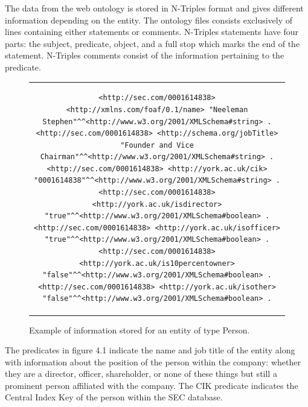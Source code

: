 \documentclass{UoYCSproject}
\begin{document}
The data from the web ontology is stored in N-Triples format and gives different information depending on the entity. The ontology files consists exclusively of lines containing either statements or comments. N-Triples statements have four parts: the subject, predicate, object, and a full stop which marks the end of the statement. N-Triples comments consist of the information pertaining to the predicate.\newpage

\begin{figure}[t]
\begin{center}
\begin{tabular}{c}
\begin{lstlisting}[breaklines, basicstyle=\small, columns=fullflexible]
<http://sec.com/0001614838> <http://xmlns.com/foaf/0.1/name> "Neeleman Stephen"^^<http://www.w3.org/2001/XMLSchema#string> .
<http://sec.com/0001614838> <http://schema.org/jobTitle> "Founder and Vice Chairman"^^<http://www.w3.org/2001/XMLSchema#string> .
<http://sec.com/0001614838> <http://york.ac.uk/cik> "0001614838"^^<http://www.w3.org/2001/XMLSchema#string> .
<http://sec.com/0001614838> <http://york.ac.uk/isdirector> "true"^^<http://www.w3.org/2001/XMLSchema#boolean> .
<http://sec.com/0001614838> <http://york.ac.uk/isofficer> "true"^^<http://www.w3.org/2001/XMLSchema#boolean> .
<http://sec.com/0001614838> <http://york.ac.uk/is10percentowner> "false"^^<http://www.w3.org/2001/XMLSchema#boolean> .
<http://sec.com/0001614838> <http://york.ac.uk/isother> "false"^^<http://www.w3.org/2001/XMLSchema#boolean> .
\end{lstlisting}
\end{tabular}
\end{center}
\caption{Example of information stored for an entity of type Person.}
\end{figure}

The predicates in figure 4.1 indicate the name and job title of the entity along with information about the position of the person within the company: whether they are a director, officer, shareholder, or none of these things but still a prominent person affiliated with the company. The CIK predicate indicates the Central Index Key of the person within the SEC database.
\end{document}
